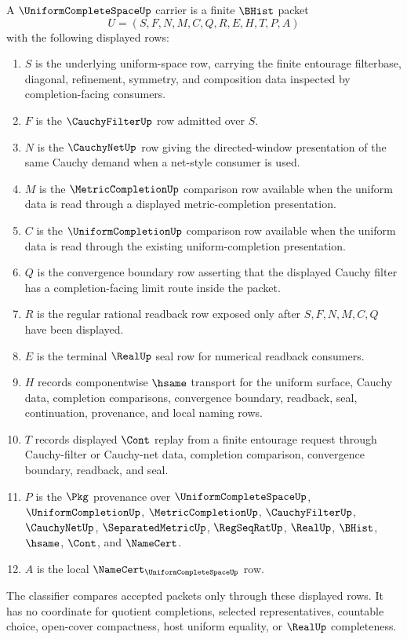 \begin{definition}
\label{def:uniform-complete-space-carrier}
A $\UniformCompleteSpaceUp$ carrier is a finite $\BHist$ packet
$$
U=(S,F,N,M,C,Q,R,E,H,T,P,A)
$$
with the following displayed rows:
\begin{enumerate}
\item $S$ is the underlying uniform-space row, carrying the finite entourage
filterbase, diagonal, refinement, symmetry, and composition data inspected by
completion-facing consumers.
\item $F$ is the $\CauchyFilterUp$ row admitted over $S$.
\item $N$ is the $\CauchyNetUp$ row giving the directed-window presentation of
the same Cauchy demand when a net-style consumer is used.
\item $M$ is the $\MetricCompletionUp$ comparison row available when the
uniform data is read through a displayed metric-completion presentation.
\item $C$ is the $\UniformCompletionUp$ comparison row available when the
uniform data is read through the existing uniform-completion presentation.
\item $Q$ is the convergence boundary row asserting that the displayed Cauchy
filter has a completion-facing limit route inside the packet.
\item $R$ is the regular rational readback row exposed only after $S,F,N,M,C,Q$
have been displayed.
\item $E$ is the terminal $\RealUp$ seal row for numerical readback consumers.
\item $H$ records componentwise $\hsame$ transport for the uniform surface,
Cauchy data, completion comparisons, convergence boundary, readback, seal,
continuation, provenance, and local naming rows.
\item $T$ records displayed $\Cont$ replay from a finite entourage request
through Cauchy-filter or Cauchy-net data, completion comparison, convergence
boundary, readback, and seal.
\item $P$ is the $\Pkg$ provenance over $\UniformCompleteSpaceUp$,
$\UniformCompletionUp$, $\MetricCompletionUp$, $\CauchyFilterUp$,
$\CauchyNetUp$, $\SeparatedMetricUp$, $\RegSeqRatUp$, $\RealUp$, $\BHist$,
$\hsame$, $\Cont$, and $\NameCert$.
\item $A$ is the local $\NameCert_{\UniformCompleteSpaceUp}$ row.
\end{enumerate}
The classifier compares accepted packets only through these displayed rows. It
has no coordinate for quotient completions, selected representatives, countable
choice, open-cover compactness, host uniform equality, or $\RealUp$
completeness.
\end{definition}


